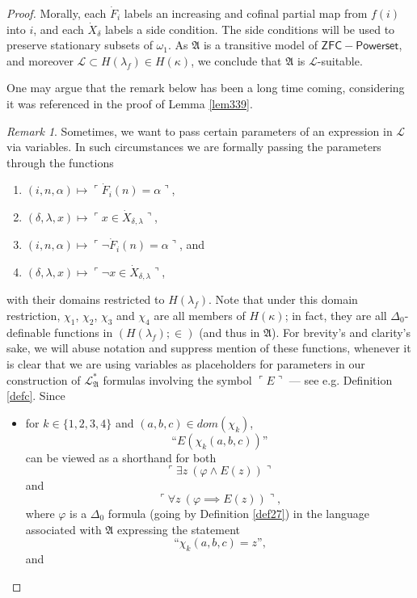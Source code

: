 \documentclass[12pt, twoside]{memoir}
\numberwithin{equation}{section}
\theoremstyle{definition}
\theoremstyle{remark}
\newtheorem{rem}[thm]{Remark}
\theoremstyle{definition}
\theoremstyle{definition}
\theoremstyle{definition}
\theoremstyle{remark}
\begin{document}
\begin{proof}
Morally, each $\dot{F}_i$ labels an increasing and cofinal partial map from $f(i)$ into $i$, and each $\dot{X}_{\delta}$ labels a side condition. The side conditions will be used to preserve stationary subsets of $\omega_1$. As 
$\mathfrak{A}$ is a transitive model of $\mathsf{ZFC - Powerset}$, and moreover $\mathcal{L} \subset H(\lambda_f) \in H(\kappa)$, we conclude that $\mathfrak{A}$ is $\mathcal{L}$-suitable.

One may argue that the remark below has been a long time coming, considering it was referenced in the proof of Lemma \ref{lem339}.

\begin{rem}\label{rempp}
Sometimes, we want to pass certain parameters of an expression in $\mathcal{L}$ via variables. In such circumstances we are formally passing the parameters through the functions
\begin{enumerate}[label=$\chi_{\arabic*} :$, leftmargin=45pt]
    \item $(i, n, \alpha) \mapsto \ulcorner \dot{F}_i (n) = \alpha \urcorner$,
    \item $(\delta, \lambda, x) \mapsto \ulcorner x \in \dot{X}_{\delta, \lambda} \urcorner$,
    \item $(i, n, \alpha) \mapsto \ulcorner \neg \dot{F}_i (n) = \alpha \urcorner$, and
    \item $(\delta, \lambda, x) \mapsto \ulcorner \neg x \in \dot{X}_{\delta, \lambda} \urcorner$,
\end{enumerate}
with their domains restricted to $H(\lambda_f)$. Note that under this domain restriction, $\chi_1$, $\chi_2$, $\chi_3$ and $\chi_4$ are all members of $H(\kappa)$; in fact, they are all $\Delta_0$-definable functions in $(H(\lambda_f); \in)$ (and thus in $\mathfrak{A}$). For brevity's and clarity's sake, we will abuse notation and suppress mention of these functions, whenever it is clear that we are using variables as placeholders for parameters in our construction of $\mathcal{L}^{*}_{\mathfrak{A}}$ formulas involving the symbol $\ulcorner E \urcorner$ --- see e.g. Definition \ref{defc}. Since 
\begin{itemize}
    \item for $k \in \{1, 2, 3, 4\}$ and $(a, b, c) \in dom(\chi_k)$, $$\text{``} E(\chi_k(a,b,c)) \text{''}$$ can be viewed as a shorthand for both $$\ulcorner \exists z \ (\varphi \wedge E(z)) \urcorner$$ and $$\ulcorner \forall z \ (\varphi \implies E(z)) \urcorner,$$ where $\varphi$ is a $\Delta_0$ formula (going by Definition \ref{def27}) in the language associated with $\mathfrak{A}$ expressing the statement $$\text{``} \chi_k(a, b, c) = z \text{'',}$$ and

\end{itemize}
\end{rem}
\end{proof}
\end{document}
